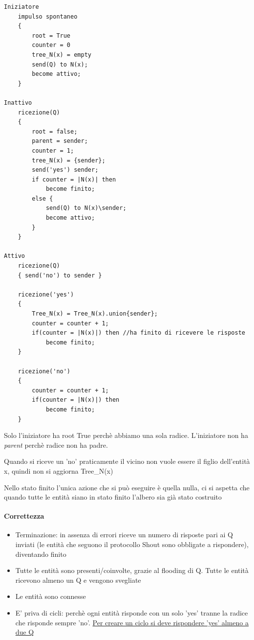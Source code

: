 \begin{lstlisting}
Iniziatore
    impulso spontaneo
    {
        root = True 
        counter = 0
        tree_N(x) = empty
        send(Q) to N(x);
        become attivo;
    }
    
Inattivo
    ricezione(Q)
    {
        root = false;
        parent = sender;
        counter = 1;
        tree_N(x) = {sender};
        send('yes') sender;
        if counter = |N(x)| then
            become finito;
        else {
            send(Q) to N(x)\sender;
            become attivo;
        }
    }

Attivo
    ricezione(Q)
    { send('no') to sender }
    
    ricezione('yes')
    {
        Tree_N(x) = Tree_N(x).union{sender};
        counter = counter + 1;
        if(counter = |N(x)|) then //ha finito di ricevere le risposte
            become finito;
    }

    ricezione('no')
    {
        counter = counter + 1;
        if(counter = |N(x)|) then
            become finito;
    }
\end{lstlisting}
Solo l'iniziatore ha root True perchè abbiamo una sola radice. L'iniziatore non ha \textit{parent} perchè radice non ha padre.

Quando si riceve un 'no' praticamente il vicino non vuole essere il figlio dell'entità x, quindi non si aggiorna Tree\_N(x)
   
Nello stato finito l'unica azione che si può eseguire è quella nulla, ci si aspetta che quando tutte le entità siano in stato finito l'albero sia già stato costruito

\paragraph{Correttezza}
\begin{itemize}
    \item Terminazione: in assenza di errori riceve un numero di risposte pari ai Q inviati (le entità che seguono il protocollo Shout sono obbligate a rispondere), diventando finito
    \item Tutte le entità sono presenti/coinvolte, grazie al flooding di Q. Tutte le entità ricevono almeno un Q e vengono svegliate
    \item Le entità sono connesse
    \item E' priva di cicli: perchè ogni entità risponde con un solo 'yes' tranne la radice che risponde sempre 'no'. \uline{Per creare un ciclo si deve rispondere 'yes' almeno a due Q}
\end{itemize}

